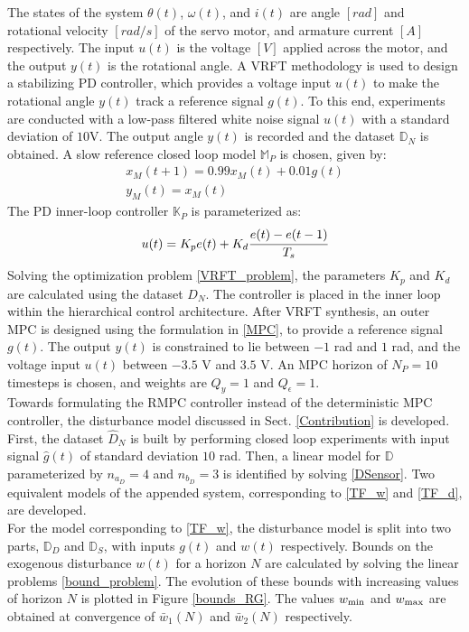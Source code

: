 \documentclass[letterpaper, 10 pt, conference]{ieeeconf}  %
\begin{document}
	\normalsize
	The states of the system $\theta(t)$, $\omega(t)$, and $i(t)$ are angle $[rad]$ and rotational velocity $[rad/s]$ of the servo motor, and armature current $[A]$ respectively. The input $u(t)$ is the voltage $[V]$ applied across the motor, and the output $y(t)$ is the rotational angle. 
	A VRFT methodology is used to design a stabilizing PD controller, which provides a voltage input $u(t)$ to make the rotational angle $y(t)$ track a reference signal $g(t)$. To this end, experiments are conducted with a low-pass filtered white noise signal $u(t)$ with a standard deviation of $10$V. The output angle $y(t)$ is recorded and the dataset $\mathbb{D}_N$ is obtained. A slow reference closed loop model $\mathbb{M}_P$ is chosen, given by:
	\begin{equation*}
	\begin{matrix}
	x_M(t+1) = 0.99x_M(t) + 0.01g(t)\\
	y_M(t) = x_M(t)
	\end{matrix}
	\end{equation*}
	The PD inner-loop controller $\mathbb{K}_P$ is parameterized as:
	\begin{equation*}
	u(t) = K_pe(t) + K_d\cfrac{e(t)-e(t-1)}{T_s}
	\end{equation*} 
	Solving the optimization problem \eqref{VRFT_problem}, the parameters 
	$K_p$ and $K_d$ are calculated using the dataset $D_N$. The controller is placed in the inner loop within the hierarchical control architecture.
	After VRFT synthesis, an outer MPC is designed using the formulation in \eqref{MPC}, to provide a reference signal $g(t)$. The output $y(t)$ is constrained to lie between $-1$ rad and $1$ rad, and the voltage input $u(t)$ between $-3.5$ V and $3.5$ V. An MPC horizon of $N_P=10$ timesteps is chosen, and weights are $Q_y=1$ and $Q_{\epsilon}=1$. \\
	Towards formulating the RMPC controller instead of the deterministic MPC controller, the disturbance model discussed in Sect. \ref{Contribution} is developed. First, the dataset $\hat{D}_N$ is built by performing closed loop experiments with input signal $\hat{g}(t)$ of standard deviation $10$ rad. Then, a linear model for $\mathbb{D}$ parameterized by $n_{a_D} = 4$ and $n_{b_D} = 3$ is identified by solving \eqref{DSensor}. Two equivalent models of the appended system, corresponding to \eqref{TF_w} and \eqref{TF_d}, are developed.  \\ 
	\indent For the model corresponding to \eqref{TF_w}, the disturbance model is split into two parts, $\mathbb{D}_D$ and $\mathbb{D}_S$, with inputs $g(t)$ and $w(t)$ respectively. Bounds on the exogenous disturbance $w(t)$ for a horizon $N$ are calculated by solving the linear problems \eqref{bound_problem}. The evolution of these bounds with increasing values of horizon $N$ is plotted in Figure \ref{bounds_RG}.  The values $w_{\rm min}$ and $w_{\rm max}$ are obtained at convergence of  $\bar{w}_1(N)$ and $\bar{w}_2(N)$ respectively.
\end{document}
